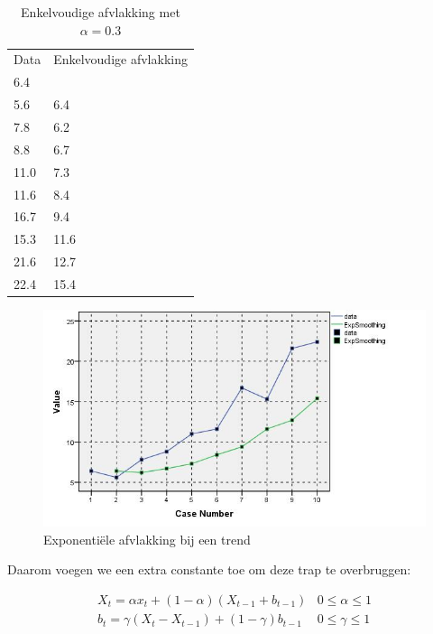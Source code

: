 \begin{table}
\centering
    \begin{tabular}{|ll|}
    \hline
    Data & Enkelvoudige afvlakking \\
    6.4  & ~                      \\
    5.6  & 6.4                    \\
    7.8  & 6.2                    \\
    8.8  & 6.7                    \\
    11.0 & 7.3                    \\
    11.6 & 8.4                    \\
    16.7 & 9.4                    \\
    15.3 & 11.6                   \\
    21.6 & 12.7                   \\
    22.4 & 15.4                   \\ \hline
    \end{tabular}
		\caption{Enkelvoudige afvlakking met $\alpha = 0.3$}
		\label{tab:trend}
\end{table}

\begin{figure}
  \centering
  \includegraphics[width=1.00\textwidth]{images/tijdreeksen/tijdreeks61.jpg}
  \caption{Exponentiële afvlakking bij een trend}
  \label{fig:tijdreeks61}
\end{figure}

Daarom voegen we een extra constante toe om deze trap te overbruggen:

\begin{definition}
\begin{eqnarray}
	X_{t} = \alpha x_{t} + (1-\alpha)(X_{t-1} + b_{t-1}) & 0 \leq \alpha \leq 1 \\
	b_{t} = \gamma(X_{t}-X_{t-1}) + (1-\gamma)b_{t-1} & 0 \leq \gamma \leq 1 
\label{eq:doubleSmoothing}
\end{eqnarray}
\end{definition}

